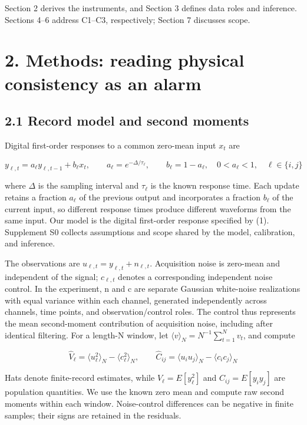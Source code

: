 \documentclass[10pt,a4paper]{article}
\begin{document}
Section 2 derives the instruments, and Section 3 defines data roles and inference. Sections 4–6 address C1–C3, respectively; Section 7 discusses scope.

\section{2. Methods: reading physical consistency as an alarm}

\subsection{2.1 Record model and second moments}

Digital first-order responses to a common zero-mean input \(x_t\) are

\begin{equation}
y_{\ell,t}=a_\ell y_{\ell,t-1}+b_\ell x_t,\qquad
a_\ell=e^{-\Delta/\tau_\ell},\qquad b_\ell=1-a_\ell,\quad
0<a_\ell<1,\quad \ell\in\{i,j\}
\tag{1}
\end{equation}

where \(\Delta\) is the sampling interval and \(\tau_\ell\) is the known response time. Each update retains a fraction \(a_\ell\) of the previous output and incorporates a fraction \(b_\ell\) of the current input, so different response times produce different waveforms from the same input. Our model is the digital first-order response specified by (1). Supplement S0 collects assumptions and scope shared by the model, calibration, and inference.

The observations are \(u_{\ell,t}=y_{\ell,t}+n_{\ell,t}\). Acquisition noise is zero-mean and independent of the signal; \(c_{\ell,t}\) denotes a corresponding independent noise control. In the experiment, n and c are separate Gaussian white-noise realizations with equal variance within each channel, generated independently across channels, time points, and observation/control roles. The control thus represents the mean second-moment contribution of acquisition noise, including after identical filtering. For a length-N window, let \(\langle v\rangle_N=N^{-1}\sum_{t=1}^N v_t\), and compute

\begin{equation}
\widehat V_\ell=\langle u_\ell^2\rangle_N-\langle c_\ell^2\rangle_N,\qquad
\widehat C_{ij}=\langle u_i u_j\rangle_N-\langle c_i c_j\rangle_N
\tag{2}
\end{equation}

Hats denote finite-record estimates, while \(V_\ell=E[y_\ell^2]\) and \(C_{ij}=E[y_i y_j]\) are population quantities. We use the known zero mean and compute raw second moments within each window. Noise-control differences can be negative in finite samples; their signs are retained in the residuals.
\end{document}
